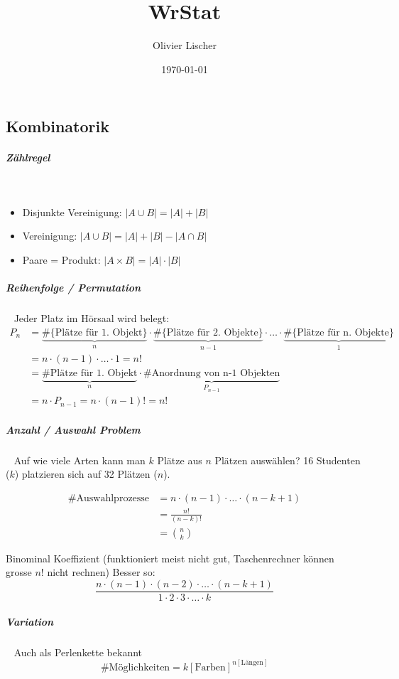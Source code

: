 \documentclass[10pt,twoside,landscape]{article}
\author{Olivier Lischer}
\date{\today}
\title{WrStat}
\begin{document}
\pagestyle{fancy}
\fancyhf{}
\fancyfoot[CE,CO]{\leftmark}
\fancyfoot[R]{\thepage}

\begin{multicols}{2}
\section{Kombinatorik}
\label{sec:org55f22d5}
\subparagraph{Zählregel} \
\label{sec:orgf9185f6}
\begin{itemize}
\item Disjunkte Vereinigung: \(|A \cup B| = |A| + |B|\)
\item Vereinigung: \(|A \cup B| = |A| + |B| - |A \cap B|\)
\item Paare = Produkt: \(|A \times B| = |A| \cdot |B|\)
\end{itemize}
\subparagraph{Reihenfolge / Permutation} \
\label{sec:org19253b7}
Jeder Platz im Hörsaal wird belegt:
\begin{align*}
  P_n &= \underbrace{\#\text{\{Plätze für 1. Objekt\}}}_{n} \cdot \underbrace{\#\text{\{Plätze für 2. Objekte\}}}_{n-1} \cdot \ldots \cdot \underbrace{\#\{\text{Plätze für n. Objekte\}}}_{1} \\
  &= n \cdot (n-1) \cdot \ldots \cdot 1 = n!  \\
  &= \underbrace{\#\text{Plätze für 1. Objekt}}_{n} \cdot \underbrace{\#\text{Anordnung von n-1 Objekten}}_{P_{n-1}} \\
  &= n \cdot P_{n-1} = n \cdot (n - 1)! = n!
\end{align*}
\subparagraph{Anzahl / Auswahl Problem} \
\label{sec:orga2bb34b}
Auf wie viele Arten kann man \(k\) Plätze aus \(n\) Plätzen auswählen?
16 Studenten (\(k\)) platzieren sich auf 32 Plätzen (\(n\)).

\begin{align*}
\text{\#Auswahlprozesse} &= n \cdot (n - 1) \cdot \ldots \cdot (n - k + 1) \\
&= \frac{n!}{(n-k)!} \\
&= \binom{n}{k}
\end{align*}

Binominal Koeffizient (funktioniert meist nicht gut, Taschenrechner können grosse \(n!\) nicht rechnen)
Besser so:
\[
\frac{n \cdot (n - 1) \cdot (n - 2) \cdot \ldots \cdot (n-k + 1)}{1 \cdot 2 \cdot 3 \cdot \ldots \cdot k}
\]
\subparagraph{Variation} \
\label{sec:org2031f28}
Auch als Perlenkette bekannt
\[
\text{\#Möglichkeiten} = k[\text{Farben}]^{n[\text{Längen}]}
\]

\end{multicols}
\end{document}
